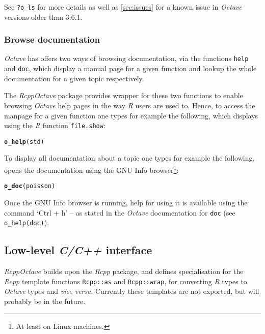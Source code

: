\documentclass[english,10pt,a4paper]{article}\usepackage{graphicx, color}
\makeatletter
\newcommand{\hlfunctioncall}[1]{\textcolor[rgb]{0.501960784313725,0,0.329411764705882}{\textbf{#1}}}%
\newenvironment{kframe}{%
 \def\at@end@of@kframe{}%
 \ifinner\ifhmode%
  \def\at@end@of@kframe{\end{minipage}}%
  \begin{minipage}{\columnwidth}%
 \fi\fi%
 \def\FrameCommand##1{\hskip\@totalleftmargin \hskip-\fboxsep
 \colorbox{shadecolor}{##1}\hskip-\fboxsep
     \hskip-\linewidth \hskip-\@totalleftmargin \hskip\columnwidth}%
 \MakeFramed {\advance\hsize-\width
   \@totalleftmargin\z@ \linewidth\hsize
   \@setminipage}}%
 {\par\unskip\endMakeFramed%
 \at@end@of@kframe}
\newenvironment{knitrout}{}{} %
\let\proglang=\textit
\let\code=\texttt
\newcommand{\pkgname}[1]{\textit{#1}\xspace}
\newcommand{\Rpkg}[1]{\pkgname{#1} package\xspace}
\newcommand{\R}{\proglang{R}\xspace}
\newcommand{\octave}{\proglang{Octave}\xspace}
\makeatother
\begin{document}
See \code{?o\_ls} for more details as well as \cref{sec:issues} for a
known issue in \octave versions older than 3.6.1.

\subsubsection{Browse documentation}

\octave has offers two ways of browsing documentation, via the functions
\code{help} and \code{doc}, which display a manual page for a given function and
lookup the whole documentation for a given topic respectively.

The \Rpkg{RcppOctave} provides wrapper for these two functions to enable
browsing \octave help pages in the way \R users are used to.
Hence, to access the manpage for a given function one types for example the
following, which displays using the \R function \code{file.show}:
\begin{knitrout}
\color{fgcolor}\begin{kframe}
\begin{alltt}
\hlfunctioncall{o_help}(std)
\end{alltt}
\end{kframe}
\end{knitrout}


To display all documentation about a topic one types for example the following,
opens the documentation using the GNU Info browser\footnote{At least on
Linux machines.}:
\begin{knitrout}
\color{fgcolor}\begin{kframe}
\begin{alltt}
\hlfunctioncall{o_doc}(poisson)
\end{alltt}
\end{kframe}
\end{knitrout}

Once the GNU Info browser is running, help for using it is available using the
command `Ctrl + h' -- as stated in the \octave documentation for \code{doc} (see
\code{o\_help(doc)}).

\subsection{Low-level \textit{C/C++} interface}

\pkgname{RcppOctave} builds upon the \Rpkg{Rcpp}, and defines specialisation
for the \proglang{Rcpp} template functions \code{Rcpp::as} and
\code{Rcpp::wrap}, for converting \proglang{R} types to \octave
types and \emph{vice versa}.
Currently these templates are not exported, but will probably be in the future.
\end{document}
